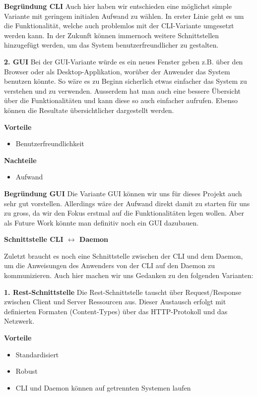 \documentclass[a4paper,12pt]{report}
\begin{document}
    \textbf{Begründung CLI} Auch hier haben wir entschieden eine möglichst simple Variante mit geringem initialen Aufwand zu wählen.
    In erster Linie geht es um die Funktionalität, welche auch problemlos mit der CLI-Variante umgesetzt werden kann.
    In der Zukunft können immernoch weitere Schnittstellen hinzugefügt werden, um das System benutzerfreundlicher zu gestalten.

    \textbf{2. GUI}
    Bei der GUI-Variante würde es ein neues Fenster geben z.B. über den Browser oder als Desktop-Applikation,
    worüber der Anwender das System benutzen könnte.
    So wäre es zu Beginn sicherlich etwas einfacher das System zu verstehen und zu verwenden.
    Ausserdem hat man auch eine bessere Übersicht über die Funktionalitäten und kann diese so auch einfacher aufrufen.
    Ebenso können die Resultate übersichtlicher dargestellt werden.

    \textbf{Vorteile}
    \begin{itemize}
        \item Benutzerfreundlichkeit
    \end{itemize}

    \textbf{Nachteile}
    \begin{itemize}
        \item Aufwand
    \end{itemize}

    \textbf{Begründung GUI} Die Variante GUI können wir uns für dieses Projekt auch sehr gut vorstellen.
    Allerdings wäre der Aufwand direkt damit zu starten für uns zu gross, da wir den Fokus erstmal auf die Funktionalitäten legen wollen.
    Aber als Future Work könnte man definitiv noch ein GUI dazubauen.

        {\large\bfseries Schnittstelle CLI $\leftrightarrow$ Daemon}

    Zuletzt braucht es noch eine Schnittstelle zwischen der CLI und dem Daemon,
    um die Anweisungen des Anwenders von der CLI auf den Daemon zu kommunizieren.
    Auch hier machen wir uns Gedanken zu den folgenden Varianten:

    \textbf{1. Rest-Schnittstelle}
    Die Rest-Schnittstelle tauscht über Request/Response zwischen Client und Server Ressourcen aus.
    Dieser Austausch erfolgt mit definierten Formaten (Content-Types) über das HTTP-Protokoll und das Netzwerk.

    \textbf{Vorteile}
    \begin{itemize}
        \item Standardisiert
        \item Robust
        \item CLI und Daemon können auf getrennten Systemen laufen
    \end{itemize}
\end{document}
